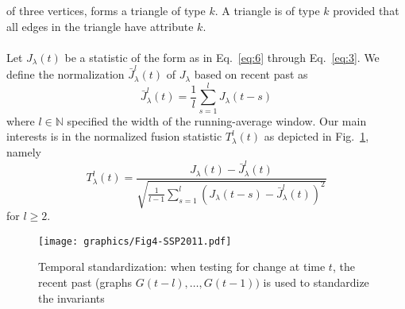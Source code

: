 \documentclass[draftcls]{IEEEtran}
\theoremstyle{definition}
\begin{document}
of three vertices, forms a triangle of type $k$. A triangle
is of type $k$ provided that all edges in the triangle have attribute
$k$. \\ \\
\noindent
Let $J_{\lambda}(t)$ be a statistic of the form as in Eq.~\eqref{eq:6} through
Eq.~\eqref{eq:3}. We define the normalization $\bar{J}^{l}_\lambda(t)$
of $J_{\lambda}$ based on recent past as
\begin{equation}
  \label{eq:4}
 \bar{J}^{l}_{\lambda}(t) = \frac{1}{l}\sum_{s = 1}^{l} J_{\lambda}(t - s) 
\end{equation}
where $l \in \mathbb{N}$ specified the width of the running-average
window. Our main interests is in the normalized fusion
statistic $T_{\lambda}^{l}(t)$ as depicted in Fig.~\ref{fig:temporal}, namely
\begin{equation}
  \label{eq:7}
 T_{\lambda}^{l}(t) = %
   \frac{J_{\lambda}(t) -
     \bar{J}_{\lambda}^{l}(t)}{\sqrt{\tfrac{1}{l-1}
       \sum_{s=1}^{l}(J_{\lambda}(t - s) - \bar{J}_{\lambda}^{l}(t))^2}}
\end{equation}
for $l \geq 2$. 
\begin{figure}[htbp]
  \centering
  \texttt{[image: graphics/Fig4-SSP2011.pdf]}
  \caption{Temporal standardization: when testing for change at time
    $t$, the recent past (graphs $G(t - l), \dots, G(t-1))$ is used to
    standardize the invariants}
  \label{fig:temporal}
\end{figure}
\end{document}

